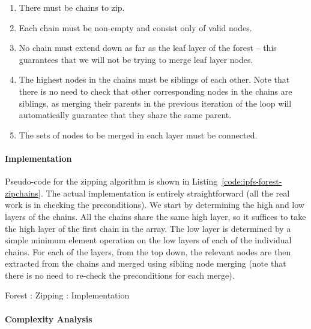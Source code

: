 \begin{enumerate}

\item There must be chains to zip.%
\item Each chain must be non-empty and consist only of valid nodes.
\item No chain must extend down as far as the leaf layer of the forest -- this guarantees that we will not be trying to merge leaf layer nodes.%
\item The highest nodes in the chains must be siblings of each other. Note that there is no need to check that other corresponding nodes in the chains are siblings, as merging their parents in the previous iteration of the loop will automatically guarantee that they share the same parent.
\item The sets of nodes to be merged in each layer must be connected.

\end{enumerate}

\paragraph{Implementation}

Pseudo-code for the zipping algorithm is shown in Listing~\ref{code:ipfs-forest-zipchains}. The actual implementation is entirely straightforward (all the real work is in checking the preconditions). We start by determining the high and low layers of the chains. All the chains share the same high layer, so it suffices to take the high layer of the first chain in the array. The low layer is determined by a simple minimum element operation on the low layers of each of the individual chains. For each of the layers, from the top down, the relevant nodes are then extracted from the chains and merged using sibling node merging (note that there is no need to re-check the preconditions for each merge).

\begin{stulisting}[p]
\caption{Forest : Zipping : Implementation}
\label{code:ipfs-forest-zipchains}

\end{stulisting}

\paragraph{Complexity Analysis}

